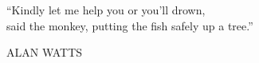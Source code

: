 \clearpage

\newlength\longest

\thispagestyle{empty}
\null\vfill

\settowidth{}

\begin{center}
\parbox{\longest}{%
  \raggedright{\large\itshape%
  \par\bigskip
      ``Kindly let me help you or you'll drown,\\
      said the monkey, putting the fish safely up a tree.''\par\bigskip
  }
  \raggedleft\large\MakeUppercase{Alan Watts}\par%
}
\end{center}

\vfill\vfill

\cleardoublepage

